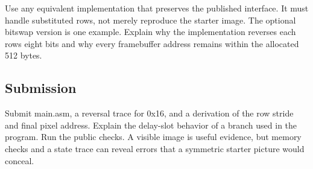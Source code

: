 Use any equivalent implementation that preserves the published
interface. It must handle substituted rows, not merely reproduce the
starter image. The optional bitswap version is one example. Explain why
the implementation reverses each row\textquotesingle s eight bits and
why every framebuffer address remains within the allocated 512 bytes.

\subsection{Submission}\label{003-eight-byte-sprite-assignment-submission}

Submit main.asm, a reversal trace for 0x16, and a derivation of the row
stride and final pixel address. Explain the delay-slot behavior of a
branch used in the program. Run the public checks. A visible image is
useful evidence, but memory checks and a state trace can reveal errors
that a symmetric starter picture would conceal.
